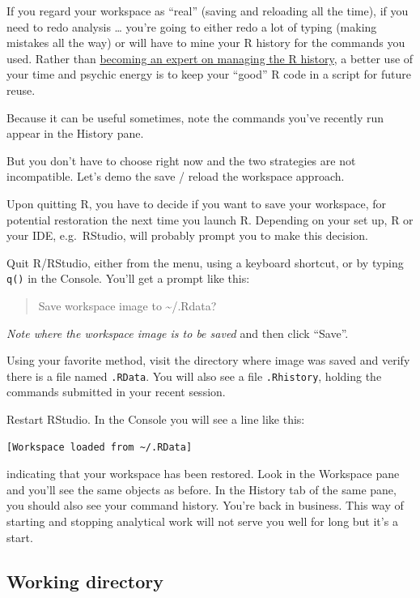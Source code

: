 \documentclass[
]{book}
\begin{document}
If you regard your workspace as ``real'' (saving and reloading all the time), if you need to redo analysis \ldots{} you're going to either redo a lot of typing (making mistakes all the way) or will have to mine your R history for the commands you used. Rather than \href{https://support.rstudio.com/hc/en-us/articles/200526217-Command-History}{becoming an expert on managing the R history}, a better use of your time and psychic energy is to keep your ``good'' R code in a script for future reuse.

Because it can be useful sometimes, note the commands you've recently run appear in the History pane.

But you don't have to choose right now and the two strategies are not incompatible. Let's demo the save / reload the workspace approach.

Upon quitting R, you have to decide if you want to save your workspace, for potential restoration the next time you launch R. Depending on your set up, R or your IDE, e.g.~RStudio, will probably prompt you to make this decision.

Quit R/RStudio, either from the menu, using a keyboard shortcut, or by typing \texttt{q()} in the Console. You'll get a prompt like this:

\begin{quote}
Save workspace image to \textasciitilde/.Rdata?
\end{quote}

\emph{Note where the workspace image is to be saved} and then click ``Save''.

Using your favorite method, visit the directory where image was saved and verify there is a file named \texttt{.RData}. You will also see a file \texttt{.Rhistory}, holding the commands submitted in your recent session.

Restart RStudio. In the Console you will see a line like this:

\begin{verbatim}
[Workspace loaded from ~/.RData]
\end{verbatim}

indicating that your workspace has been restored. Look in the Workspace pane and you'll see the same objects as before. In the History tab of the same pane, you should also see your command history. You're back in business. This way of starting and stopping analytical work will not serve you well for long but it's a start.

\hypertarget{working-directory}{%
\subsection{Working directory}\label{working-directory}}
\end{document}
